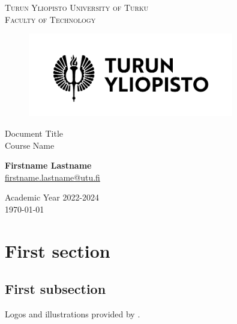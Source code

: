\documentclass[12pt]{article}
\makeatletter
\newcommand{\faculty}{Faculty of Technology}
\newcommand{\course}{Course Name}
\newcommand{\academicyear}{2022-2024}
\newcommand{\documenttitle}{Document Title}
\newcommand{\authorname}{Firstname Lastname}
\newcommand{\authoremail}{firstname.lastname@utu.fi}
\makeatother
\begin{document}
	\begin{titlepage}
		\begin{center}
			\textsc{Turun Yliopisto \textemdash \hspace{1mm} University of Turku} \\
			\textsc{\faculty}
		\end{center}
		\begin{figure}[h]
			\vspace{10mm}

			\centering\includegraphics[width=0.8\textwidth]{logo-fi.pdf}

			\vspace{20mm}
		\end{figure}
		\begin{center}
			\fontsize{10mm}{7mm}\selectfont
			\textup{\documenttitle} \\
			\textnormal{ \Large{\course}} \\

			\vspace{25mm}

			\large{\textbf{\authorname}} \\
			\large{\href{mailto:\authoremail}{\authoremail}} \\

			\vspace{30mm}

			\large{Academic Year \academicyear} \\
			\today
		\end{center}
	\end{titlepage}

	\clearpage


	\tableofcontents

	\cleardoublepage


	\section{First section}

	\subsection{First subsection}

	Logos and illustrations provided by \citeauthor{UniversityOfTurku2022}.

	\clearpage


	\printbibliography[heading=bibintoc]
\end{document}
